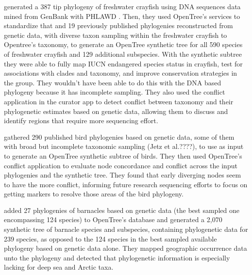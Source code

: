 \documentclass[oupdraft]{sysbio_sse}
\begin{document}
\citep{owen2015synthetic} generated a 387 tip phylogeny of freshwater crayfish using DNA sequences
data mined from GenBank with PHLAWD \citep{smith2009mega}. Then, they used OpenTree's services
 to standardize that and 19 previously published phylogenies
reconstructed from genetic data, with diverse taxon sampling within the freshwater crayfish
 to Opentree's taxonomy, to generate an OpenTree synthetic tree for all 590 species
of freshwater crayfish and 129 additional subspecies.
With the synthetic subtree they were able to fully map IUCN endangered species
status in crayfish, test for associations with clades and taxonomy, and improve conservation
strategies in the group. They wouldn't have been able to do this with the DNA based phylogeny
because it has incomplete sampling.
They also used the conflict application in the curator app to detect conflict between
taxonomy and their phylogenetic estimates based on genetic data, allowing them to
discuss and identify regions that require more sequencing effort.

\citep{brown2017development} gathered 290 published bird phylogenies based on genetic
data, some of them with broad but incomplete taxonomic sampling (Jetz et al.????),
to use as input to generate an OpenTree synthetic subtree of birds.
They then used OpenTree's conflict application to evaluate node concordance and
conflict across the input phylogenies and the synthetic tree. They found that early diverging nodes
 seem to have the more conflict, informing future research sequencing efforts to
 focus on getting markers to resolve those areas of the bird phylogeny.

\citep{ewers2019towards} added 27 phylogenies of barnacles based on genetic data
(the best sampled one encompassing 124 species) to OpenTree's database and generated
a 2,070 synthetic tree of barnacle species and subspecies, containing phylogenetic
data for 239 species, as opposed to the 124 species in the best sampled available
phylogeny based on genetic data alone. They mapped geographic occurrence data unto
the phylogeny and detected that phylogenetic information is especially lacking for
deep sea and Arctic taxa.
\end{document}
